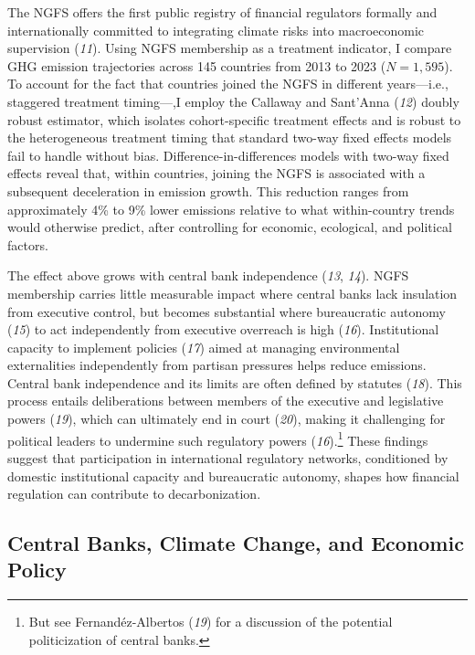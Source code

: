 \documentclass[
  12pt,
  letterpaper,
]{article}
\begin{document}
The NGFS offers the first public registry of financial regulators
formally and internationally committed to integrating climate risks into
macroeconomic supervision (\emph{11}). Using NGFS membership as a
treatment indicator, I compare GHG emission trajectories across 145
countries from 2013 to 2023 (\(N = 1,595\)). To account for the fact
that countries joined the NGFS in different years---i.e., staggered
treatment timing---,I employ the Callaway and Sant'Anna (\emph{12})
doubly robust estimator, which isolates cohort-specific treatment
effects and is robust to the heterogeneous treatment timing that
standard two-way fixed effects models fail to handle without bias.
Difference-in-differences models with two-way fixed effects reveal that,
within countries, joining the NGFS is associated with a subsequent
deceleration in emission growth. This reduction ranges from
approximately 4\% to 9\% lower emissions relative to what within-country
trends would otherwise predict, after controlling for economic,
ecological, and political factors.

The effect above grows with central bank independence (\emph{13},
\emph{14}). NGFS membership carries little measurable impact where
central banks lack insulation from executive control, but becomes
substantial where bureaucratic autonomy (\emph{15}) to act independently
from executive overreach is high (\emph{16}). Institutional capacity to
implement policies (\emph{17}) aimed at managing environmental
externalities independently from partisan pressures helps reduce
emissions. Central bank independence and its limits are often defined by
statutes (\emph{18}). This process entails deliberations between members
of the executive and legislative powers (\emph{19}), which can
ultimately end in court (\emph{20}), making it challenging for political
leaders to undermine such regulatory powers (\emph{16}).\footnote{But
  see Fernandéz-Albertos (\emph{19}) for a discussion of the potential
  politicization of central banks.} These findings suggest that
participation in international regulatory networks, conditioned by
domestic institutional capacity and bureaucratic autonomy, shapes how
financial regulation can contribute to decarbonization.

\subsection{Central Banks, Climate Change, and Economic
Policy}\label{central-banks-climate-change-and-economic-policy}
\end{document}

